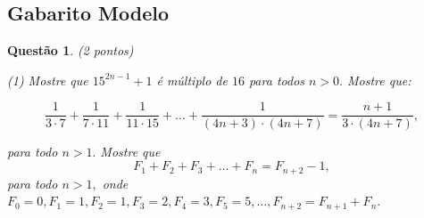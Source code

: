 \documentclass[oneside,a4paper,12pt]{article}
\newcommand{\negrito}[1]{\mbox{\boldmath{$#1$}}}
\theoremstyle{Colorido}
\theoremstyle{solu}
\theoremstyle{dotlessP}
\newtheorem{sol}{Questão}
\begin{document}
	\textcolor{Floresta}{\section{Gabarito Modelo}}
	\begin{sol}
\textit{(2 pontos)}
\begin{tasks}[counter-format={(tsk[a])},label-width=3.6ex, label-format = {\bfseries}, column-sep = {20pt}](1)
\task[\textcolor{blue}{$\negrito{(a)} $}] Mostre que $15^{2n-1} + 1$ é múltiplo de $16$ para todos $n > 0.$
\task[\textcolor{blue}{$\negrito{(b)} $}] Mostre que:
\begin{small}
\[\dfrac{1}{3 \cdot7} + \dfrac{1}{7 \cdot 11} + \dfrac{1}{11 \cdot 15} + \ldots +  \dfrac{1}{(4n + 3) \cdot (4n + 7)} = \dfrac{n+1}{3 \cdot (4n + 7)},\]
\end{small}
para todo $n > 1.$
\task[\textcolor{blue}{$\negrito{(c)} $}] Mostre que
\[
F_1 + F_2 + F_3 + \ldots + F_n = F_{n+2} - 1,
\]
para todo $n > 1,$ onde $F_0 = 0, F_1 = 1, F_2 = 1, F_3 = 2, F_4 = 3, F_5 = 5, \ldots, F_{n+2} = F_{n+1} + F_{n}.$
\end{tasks}
\end{sol}
\end{document}
